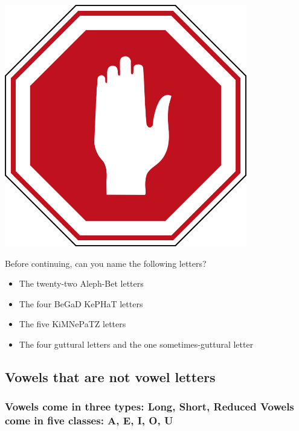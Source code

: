 \documentclass[
]{turabian-researchpaper}
\providecommand{\tightlist}{%
  \setlength{\itemsep}{0pt}\setlength{\parskip}{0pt}}
\begin{document}
\begin{center}\includegraphics[width=300pt]{images/stopil} \end{center}

Before continuing, can you name the following letters?

\begin{itemize}
\tightlist
\item
  The twenty-two Aleph-Bet letters
\item
  The four BeGaD KePHaT letters
\item
  The five KiMNePaTZ letters
\item
  The four guttural letters and the one sometimes-guttural letter
\end{itemize}

\hypertarget{two_1}{%
\subsection{Vowels that are not vowel letters}\label{two_1}}

\hypertarget{vowels-come-in-three-types-long-short-reduced-vowels-come-in-five-classes-a-e-i-o-u}{%
\subsubsection*{Vowels come in three types: Long, Short, Reduced \textbar{} Vowels come in five classes: A, E, I, O, U}\label{vowels-come-in-three-types-long-short-reduced-vowels-come-in-five-classes-a-e-i-o-u}}
\end{document}

